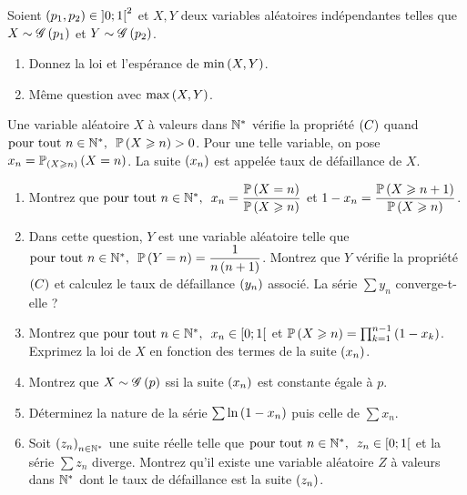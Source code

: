\begin{exoss}
Soient \(\paren{p_1,p_2}\in\intervee{0}{1}^2\) et \(X,Y\) deux variables aléatoires indépendantes telles que \(X\sim\loigeometrique{p_1}\) et \(Y\sim\loigeometrique{p_2}\).

\begin{enumerate}
    \item Donnez la loi et l'espérance de \(\min\paren{X,Y}\). \\
    \item Même question avec \(\max\paren{X,Y}\).
\end{enumerate}
\end{exoss}

\begin{exoss}
Une variable aléatoire \(X\) à valeurs dans \(\Ns\) vérifie la propriété \(\paren{C}\) quand \(\quantifs{\tpt n\in\Ns}\proba{X\geq n}>0\). Pour une telle variable, on pose \(x_n=\probacond{X=n}{\paren{X\geq n}}\). La suite \(\paren{x_n}\) est appelée taux de défaillance de \(X\).

\begin{enumerate}
    \item Montrez que \(\quantifs{\tpt n\in\Ns}x_n=\dfrac{\proba{X=n}}{\proba{X\geq n}}\) et \(1-x_n=\dfrac{\proba{X\geq n+1}}{\proba{X\geq n}}\). \\
    \item Dans cette question, \(Y\) est une variable aléatoire telle que \(\quantifs{\tpt n\in\Ns}\proba{Y=n}=\dfrac{1}{n\paren{n+1}}\). Montrez que \(Y\) vérifie la propriété \(\paren{C}\) et calculez le taux de défaillance \(\paren{y_n}\) associé. La série \(\sum y_n\) converge-t-elle ? \\
    \item Montrez que \(\quantifs{\tpt n\in\Ns}x_n\in\intervie{0}{1}\) et \(\proba{X\geq n}=\prod_{k=1}^{n-1}\paren{1-x_k}\). Exprimez la loi de \(X\) en fonction des termes de la suite \(\paren{x_n}\). \\
    \item Montrez que \(X\sim\loigeometrique{p}\) ssi la suite \(\paren{x_n}\) est constante égale à \(p\). \\
    \item Déterminez la nature de la série \(\sum\ln\paren{1-x_n}\) puis celle de \(\sum x_n\). \\
    \item Soit \(\paren{z_n}_{n\in\Ns}\) une suite réelle telle que \(\quantifs{\tpt n\in\Ns}z_n\in\intervie{0}{1}\) et la série \(\sum z_n\) diverge. Montrez qu'il existe une variable aléatoire \(Z\) à valeurs dans \(\Ns\) dont le taux de défaillance est la suite \(\paren{z_n}\).
\end{enumerate}
\end{exoss}

